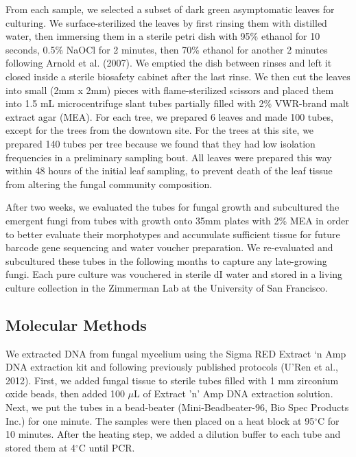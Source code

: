 \documentclass[fleqn,10pt,lineno]{wlpeerj} %
\begin{document}
From each sample, we selected a subset of dark green asymptomatic leaves for culturing. We surface-sterilized the leaves by first rinsing them with distilled water, then immersing them in a sterile petri dish with 95\% ethanol for 10 seconds, 0.5\% NaOCl for 2 minutes, then 70\% ethanol for another 2 minutes following Arnold et al. (2007). We emptied the dish between rinses and left it closed inside a sterile biosafety cabinet after the last rinse. We then cut the leaves into small (2mm x 2mm) pieces with flame-sterilized scissors and placed them into 1.5 mL microcentrifuge slant tubes partially filled with 2\% VWR-brand malt extract agar (MEA). For each tree, we prepared 6 leaves and made 100 tubes, except for the trees from the downtown site. For the trees at this site, we prepared 140 tubes per tree because we found that they had low isolation frequencies in a preliminary sampling bout. All leaves were prepared this way within 48 hours of the initial leaf sampling, to prevent death of the leaf tissue from altering the fungal community composition.

After two weeks, we evaluated the tubes for fungal growth and subcultured the emergent fungi from tubes with growth onto 35mm plates with 2\% MEA in order to better evaluate their morphotypes and accumulate sufficient tissue for future barcode gene sequencing and water voucher preparation. We re-evaluated and subcultured these tubes in the following months to capture any late-growing fungi. Each pure culture was vouchered in sterile dI water and stored in a living culture collection in the Zimmerman Lab at the University of San Francisco.

\hypertarget{molecular-methods}{%
\subsection*{Molecular Methods}\label{molecular-methods}}

We extracted DNA from fungal mycelium using the Sigma RED Extract `n Amp DNA extraction kit and following previously published protocols (U'Ren et al., 2012). First, we added fungal tissue to sterile tubes filled with 1 mm zirconium oxide beads, then added 100 \(\mu\)L of Extract 'n' Amp DNA extraction solution. Next, we put the tubes in a bead-beater (Mini-Beadbeater-96, Bio Spec Products Inc.) for one minute. The samples were then placed on a heat block at 95\(^{\circ}\)C for 10 minutes. After the heating step, we added a dilution buffer to each tube and stored them at 4\(^{\circ}\)C until PCR.
\end{document}
